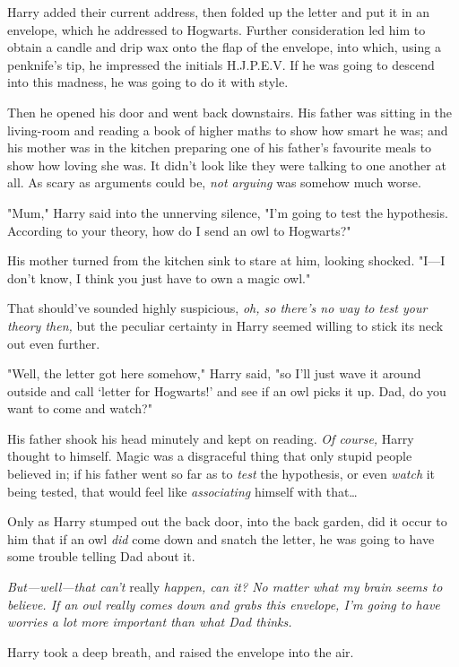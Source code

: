 Harry added their current address, then folded up the letter and put it in an
envelope, which he addressed to Hogwarts. Further consideration led him to
obtain a candle and drip wax onto the flap of the envelope, into which, using a
penknife's tip, he impressed the initials H.J.P.E.V. If he was going to descend
into this madness, he was going to do it with style.

Then he opened his door and went back downstairs. His father was sitting in the
living-room and reading a book of higher maths to show how smart he was; and
his mother was in the kitchen preparing one of his father's favourite meals to
show how loving she was. It didn't look like they were talking to one another
at all. As scary as arguments could be, \emph{not arguing} was somehow much
worse.

"Mum," Harry said into the unnerving silence, "I'm going to test the
hypothesis. According to your theory, how do I send an owl to Hogwarts?"

His mother turned from the kitchen sink to stare at him, looking shocked.
"I---I don't know, I think you just have to own a magic owl."

That should've sounded highly suspicious, \emph{oh, so there's no way to test
your theory then,} but the peculiar certainty in Harry seemed willing to stick
its neck out even further.

"Well, the letter got here somehow," Harry said, "so I'll just wave it around
outside and call `letter for Hogwarts!' and see if an owl picks it up. Dad, do
you want to come and watch?"

His father shook his head minutely and kept on reading. \emph{Of course,} Harry
thought to himself. Magic was a disgraceful thing that only stupid people
believed in; if his father went so far as to \emph{test} the hypothesis, or
even \emph{watch} it being tested, that would feel like \emph{associating}
himself with that{\ldots}

Only as Harry stumped out the back door, into the back garden, did it occur to
him that if an owl \emph{did} come down and snatch the letter, he was going to
have some trouble telling Dad about it.

\emph{But---well---that can't} really \emph{happen, can it? No matter what my
brain seems to believe. If an owl really comes down and grabs this envelope,
I'm going to have worries a lot more important than what Dad thinks.}

Harry took a deep breath, and raised the envelope into the air.

